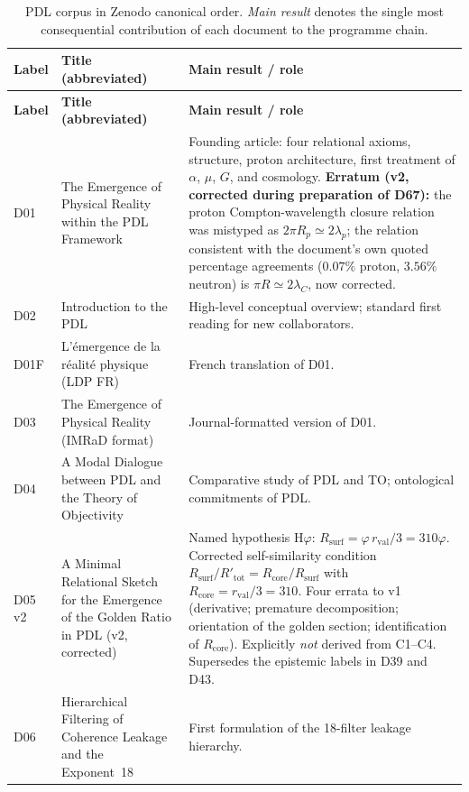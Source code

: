 \documentclass[11pt,a4paper]{article}
\theoremstyle{plain}
\theoremstyle{definition}
\theoremstyle{remark}
\newcommand{\rval}{r_{\mathrm{val}}}
\newcommand{\Rsurf}{R_{\mathrm{surf}}}
\begin{document}
\begin{longtable}{L{1.3cm}L{3.8cm}L{8.0cm}}
\caption{PDL corpus in Zenodo canonical order. \emph{Main result} denotes the single most consequential contribution of each document to the programme chain.}
\label{tab:documents}\\
\toprule
\textbf{Label} & \textbf{Title (abbreviated)} & \textbf{Main result / role}\\
\midrule
\endfirsthead
\toprule
\textbf{Label} & \textbf{Title (abbreviated)} & \textbf{Main result / role}\\
\midrule
\endhead
\bottomrule
\endfoot
D01 & The Emergence of Physical Reality within the PDL Framework~\cite{D01} & Founding article: four relational axioms, structure, proton architecture, first treatment of $\alpha$, $\mu$, $G$, and cosmology. \textbf{Erratum (v2, corrected during preparation of D67):} the proton Compton-wavelength closure relation was mistyped as $2\pi R_p\simeq2\lambda_p$; the relation consistent with the document's own quoted percentage agreements ($0.07\%$ proton, $3.56\%$ neutron) is $\pi R\simeq2\lambda_C$, now corrected.\\[0.3em]
D02 & Introduction to the PDL~\cite{D02} & High-level conceptual overview; standard first reading for new collaborators.\\[0.3em]
D01F & L'\'emergence de la r\'ealit\'e physique (LDP FR)~\cite{D01F} & French translation of D01.\\[0.3em]
D03 & The Emergence of Physical Reality (IMRaD format)~\cite{D03} & Journal-formatted version of D01.\\[0.3em]
D04 & A Modal Dialogue between PDL and the Theory of Objectivity~\cite{D04} & Comparative study of PDL and TO; ontological commitments of PDL.\\[0.3em]
D05\,v2 & A Minimal Relational Sketch for the Emergence of the Golden Ratio in PDL (v2, corrected)~\cite{D05} & \textcolor{hypothesisorange}{Named hypothesis H$\varphi$}: $\Rsurf=\varphi\,\rval/3=310\varphi$. Corrected self-similarity condition $\Rsurf/R'_{\mathrm{tot}}=R_{\mathrm{core}}/\Rsurf$ with $R_{\mathrm{core}}=\rval/3=310$. Four errata to v1 (derivative; premature decomposition; orientation of the golden section; identification of $R_{\mathrm{core}}$). Explicitly \emph{not} derived from C1--C4. Supersedes the epistemic labels in D39 and D43.\\[0.3em]
D06 & Hierarchical Filtering of Coherence Leakage and the Exponent~18~\cite{D06} & First formulation of the 18-filter leakage hierarchy.\\[0.3em]

\end{longtable}
\end{document}
